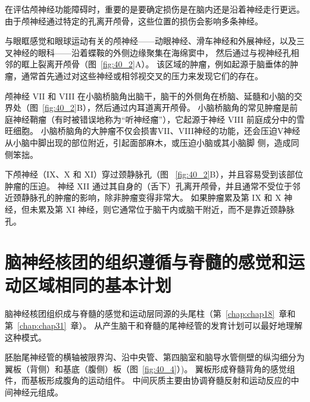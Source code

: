 在评估颅神经功能障碍时，重要的是要确定损伤是在脑内还是沿着神经走行更远。
由于颅神经通过特定的孔离开颅骨，这些位置的损伤会影响多条神经。


与眼眶感觉和眼球运动有关的颅神经——动眼神经、滑车神经和外展神经，以及三叉神经的眼科——沿着蝶鞍的外侧边缘聚集在海绵窦中， 然后通过与视神经孔相邻的眶上裂离开颅骨（图~\ref{fig:40_2}A）。
该区域的肿瘤，例如起源于脑垂体的肿瘤，通常首先通过对这些神经或相邻视交叉的压力来发现它们的存在。


颅神经 VII 和 VIII 在小脑桥脑角出脑干，脑干的外侧角在桥脑、延髓和小脑的交界处（图~\ref{fig:40_2}B），然后通过内耳道离开颅骨。
小脑桥脑角的常见肿瘤是前庭神经鞘瘤（有时被错误地称为“听神经瘤”），它起源于神经 VIII 前庭成分中的雪旺细胞。
小脑桥脑角的大肿瘤不仅会损害VII、VIII神经的功能，还会压迫V神经从小脑中脚出现的部位附近，引起面部麻木，或压迫小脑或其小脑脚 侧，造成同侧笨拙。


下颅神经（IX、X 和 XI）穿过颈静脉孔（图 ~\ref{fig:40_2}B），并且容易受到该部位肿瘤的压迫。
神经 XII 通过其自身的（舌下）孔离开颅骨，并且通常不受位于邻近颈静脉孔的肿瘤的影响，除非肿瘤变得非常大。
如果肿瘤累及第 IX 和 X 神经，但未累及第 XI 神经，则它通常位于脑干内或脑干附近，而不是靠近颈静脉孔。



\section{脑神经核团的组织遵循与脊髓的感觉和运动区域相同的基本计划}

脑神经核团组织成与脊髓的感觉和运动层同源的头尾柱（第~\ref{chap:chap18}~章和第~\ref{chap:chap31}~章）。
从产生脑干和脊髓的尾神经管的发育计划可以最好地理解这种模式。


胚胎尾神经管的横轴被限界沟、沿中央管、第四脑室和脑导水管侧壁的纵沟细分为翼板（背侧）和基底（腹侧）板（图~\ref{fig:40_4}）)。
翼板形成脊髓背角的感觉组件，而基板形成腹角的运动组件。
中间灰质主要由协调脊髓反射和运动反应的中间神经元组成。


